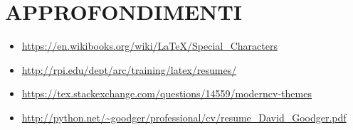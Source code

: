 \documentclass[a4paper,10pt]{article}
\begin{document}
\section{APPROFONDIMENTI}
\begin{itemize}
 \item \url{https://en.wikibooks.org/wiki/LaTeX/Special_Characters}
 \item \url{http://rpi.edu/dept/arc/training/latex/resumes/}
 \item \url{https://tex.stackexchange.com/questions/14559/moderncv-themes}
 \item \url{http://python.net/~goodger/professional/cv/resume_David_Goodger.pdf}
\end{itemize}
\end{document}
